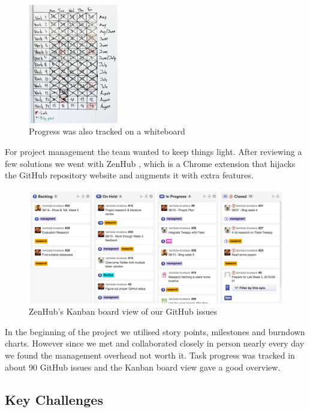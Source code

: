 \documentclass{article}
\begin{document}
\begin{figure}[H]
    \centering
    \includegraphics[width=0.35\textwidth]{whiteboard2}
    \caption{Progress was also tracked on a whiteboard}
\end{figure}

For project management the team wanted to keep things light. After reviewing a few solutions \cite{ll-blog-week2} we went with ZenHub \cite{zenhub}, which is a Chrome extension that hijacks the GitHub repository website and augments it with extra features.

\begin{figure}[H]
    \centering
    \includegraphics[width=\textwidth]{kanbanboard}
    \caption{ZenHub's Kanban board view of our GitHub issues}
\end{figure}

In the beginning of the project we utilised story points, milestones and burndown charts. However since we met and collaborated closely in person nearly every day we found the management overhead not worth it. Task progress was tracked in about 90 GitHub issues and the Kanban board view gave a good overview.

\subsection{Key Challenges} %
\end{document}
